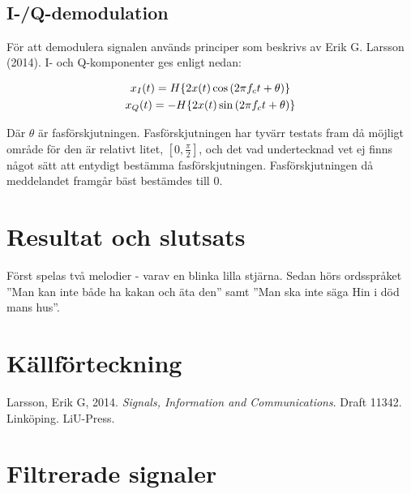 \documentclass[10pt]{article}
\begin{document}
\newpage
~\\
\newpage
\subsection{I-/Q-demodulation}

För att demodulera signalen används principer som beskrivs av Erik G. Larsson (2014). I- och Q-komponenter ges enligt nedan: 

\begin{gather}
x_{I}(t) = \Large{H}\{2x(t)\cos{(2{\pi}f_{c}t + \theta)}\} \\
x_{Q}(t) = -\Large{H}\{2x(t)\sin{(2{\pi}f_{c}t + \theta)}\}
\label{equ:iq}
\end{gather}

Där $\theta$ är fasförskjutningen. Fasförskjutningen har tyvärr testats fram då möjligt område för den är relativt litet, $[0,\frac{\pi}{2}]$, och det vad undertecknad vet ej finns något sätt att entydigt bestämma fasförskjutningen. Fasförskjutningen då meddelandet framgår bäst bestämdes till $0$.



\newpage
\section{Resultat och slutsats}

Först spelas två melodier - varav en blinka lilla stjärna. Sedan hörs ordsspråket ''Man kan inte både ha kakan och äta den'' samt ''Man ska inte säga Hin i död mans hus''. 


\section{Källförteckning}

Larsson, Erik G, 2014. \textit{Signals, Information and Communications}. Draft 11342. Linköping. LiU-Press.


\onecolumn
\appendix
\pagestyle{empty}
\section{Filtrerade signaler}
\end{document}
